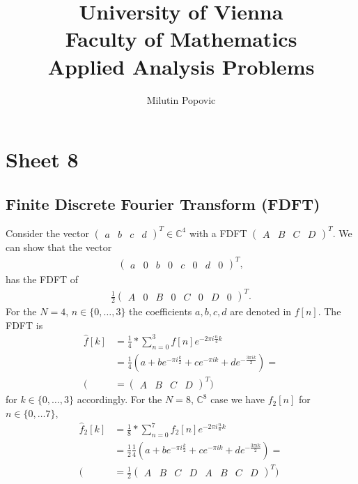 \documentclass[a4paper]{article}
\title{University of Vienna\\ Faculty of Mathematics\\
\vspace{1cm}Applied Analysis Problems
}
\author{Milutin Popovic}
\begin{document}
\maketitle
\tableofcontents

\section{Sheet 8}
\subsection{Finite Discrete Fourier Transform (FDFT)}
Consider the vector $\begin{pmatrix}a & b & c & d\end{pmatrix}^T \in
\mathbb{C}^4$ with a FDFT $\begin{pmatrix}A & B & C & D\end{pmatrix}^T$. We
can show that the vector
\begin{align}
    \begin{pmatrix}a & 0 & b & 0 & c & 0 & d & 0\end{pmatrix}^T,
\end{align}
has the FDFT of
\begin{align}
    \frac{1}{2}\begin{pmatrix}A & 0 & B & 0 & C & 0 & D & 0\end{pmatrix}^T.
\end{align}
For the $N=4$, $n\in\{0,\dots,3\}$ the coefficients $a, b, c, d$ are denoted in
$f[n]$. The FDFT is
\begin{align}
    \hat{f}[k] &= \frac{1}{4} * \sum_{n=0}^3 f[n] e^{-2\pi i \frac{n}{4}k} \\
               &=\frac{1}{4}\left(
                   a + be^{-\pi i \frac{k}{2}}
                   + ce^{-\pi i k}+ de^{-\frac{3\pi i k}{2}}
               \right) = \\
    (&=\begin{pmatrix}A & B & C & D\end{pmatrix}^T)
\end{align}
for $k \in \{0,\dots, 3\}$ accordingly. For the $N=8$, $\mathbb{C}^8$ case
 we have $f_2[n]$ for $n \in \{0,\dots 7\}$,
 \begin{align}
    \hat{f}_2[k] &= \frac{1}{8} * \sum_{n=0}^7 f_2[n] e^{-2\pi i \frac{n}{8}k} \\
               &=\frac{1}{2}\frac{1}{4}\left(
                   a + be^{-\pi i \frac{k}{2}}
                   + ce^{-\pi i k}+ de^{-\frac{3\pi i k}{2}}
               \right) = \\
    (&=\frac{1}{2}\begin{pmatrix}A & B & C & D & A & B & C & D\end{pmatrix}^T)
 \end{align}
\end{document}
